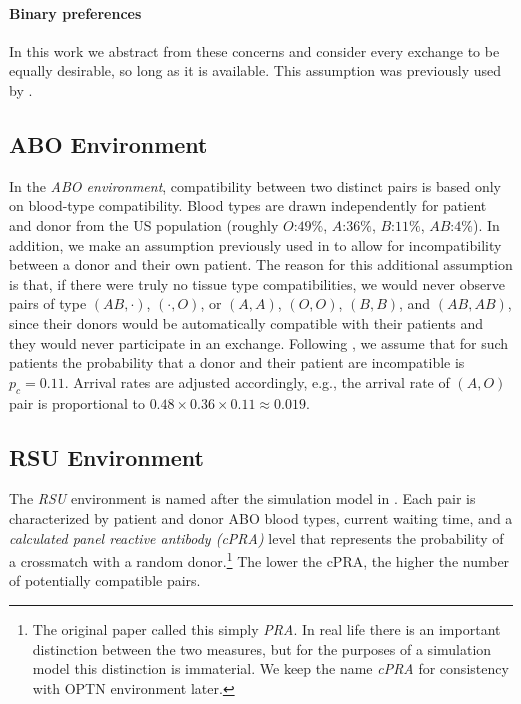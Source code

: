 \documentclass[format=acmsmall, review=false]{acmart}
\begin{document}
\paragraph{Binary preferences} In this work we abstract from these concerns and consider every exchange to be equally desirable, so long as it is available. This assumption was previously used by \citet{roth2005pairwise}. 

\subsection{ABO Environment}

In the \emph{ABO environment}, compatibility between two distinct pairs is based only on blood-type compatibility. Blood types are drawn independently for patient and donor from the US population (roughly $O$:$49\%$, $A$:$36\%$, $B$:$11\%$, $AB$:$4\%$). In addition, we make an assumption previously used in \citet{unver2010dynamic} to allow for incompatibility between a donor and their own patient. The reason for this additional assumption is that, if there were truly no tissue type compatibilities, we would never observe pairs of type $(AB,\cdot)$, $(\cdot, O)$, or $(A,A)$, $(O,O)$, $(B,B)$, and $(AB,AB)$, since their donors would be automatically compatible with their patients and they would never participate in an exchange. Following \citet{zenios2001primum}, we assume that for such patients the probability that a donor and their patient are incompatible is $p_c = 0.11$. Arrival rates are adjusted accordingly, e.g., the arrival rate of $(A,O)$ pair is proportional to $0.48 \times 0.36 \times 0.11 \approx 0.019$.

\subsection{RSU Environment}

The \emph{RSU} environment is named after the simulation model in \citet*{roth2007efficient}. Each pair is characterized by patient and donor ABO blood types, current waiting time, and a \emph{calculated panel reactive antibody (cPRA)} level that represents the probability of a crossmatch with a random donor.\footnote{The original \citet{roth2007efficient} paper called this simply \emph{PRA}. In real life there is an important distinction between the two measures, but for the purposes of a simulation model this distinction is immaterial. We keep the name \emph{cPRA} for consistency with OPTN environment later.} The lower the cPRA, the higher the number of potentially compatible pairs.
\end{document}

